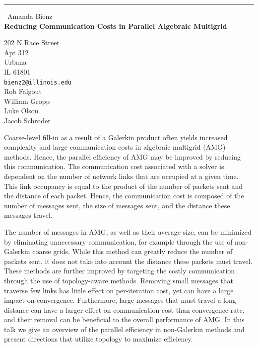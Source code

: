 \documentclass{report}
\begin{document}
\begin{center}
\rule{6in}{1pt} \
{\large Amanda Bienz \\
{\bf Reducing Communication Costs in Parallel Algebraic Multigrid}}

202 N Race Street \\ Apt 312 \\ Urbana \\ IL 61801
\\
{\tt bienz2@illinois.edu}\\
Rob Falgout\\
William Gropp\\
Luke Olson\\
Jacob Schroder\end{center}

Coarse-level fill-in as a result of a Galerkin product often yields
increased complexity and large communication costs in algebraic multigrid
(AMG) methods. Hence, the parallel efficiency of AMG may be improved by
reducing this communication. The communication cost associated with a
solver is dependent on the number of network links that are occupied at a
given time. This link occupancy is equal to the product of the number of
packets sent and the distance of each packet. Hence, the communication
cost is composed of the number of messages sent, the size of messages
sent, and the distance these messages travel.

The number of messages in AMG, as well as their average size, can be
minimized by eliminating unnecessary communication, for example through
the use of non-Galerkin coarse grids. While this method can greatly
reduce the number of packets sent, it does not take into account the
distance these packets must travel. These methods are further improved by
targeting the costly communication through the use of topology-aware
methods. Removing small messages that traverse few links has little
effect on per-iteration cost, yet can have a large impact on convergence.
Furthermore, large messages that must travel a long distance can have a
larger effect on communication cost than convergence rate, and their
removal can be beneficial to the overall performance of AMG. In this talk
we give an overview of the parallel efficiency in non-Galerkin methods
and present directions that utilize topology to maximize efficiency.
\end{document}
